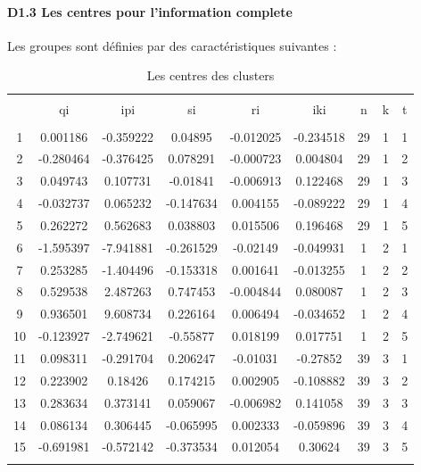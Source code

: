 \documentclass[11pt,]{article}
\let\oldparagraph\paragraph
\renewcommand{\paragraph}[1]{\oldparagraph{#1}\mbox{}}
\begin{document}
\FloatBarrier

\newpage

\hypertarget{d1.3-les-centres-pour-linformation-complete}{%
\paragraph{D1.3 Les centres pour l'information
complete}\label{d1.3-les-centres-pour-linformation-complete}}

Les groupes sont définies par des caractéristiques suivantes :

\FloatBarrier

\begin{table}[!htbp] \centering 
  \caption{Les centres des clusters} 
  \label{} 
\begin{tabular}{@{\extracolsep{5pt}} ccccccccc} 
\\[-1.8ex]\hline 
\hline \\[-1.8ex] 
 & qi & ipi & si & ri & iki & n & k & t \\ 
\hline \\[-1.8ex] 
1 & 0.001186 & -0.359222 & 0.04895 & -0.012025 & -0.234518 & 29 & 1 & 1 \\ 
2 & -0.280464 & -0.376425 & 0.078291 & -0.000723 & 0.004804 & 29 & 1 & 2 \\ 
3 & 0.049743 & 0.107731 & -0.01841 & -0.006913 & 0.122468 & 29 & 1 & 3 \\ 
4 & -0.032737 & 0.065232 & -0.147634 & 0.004155 & -0.089222 & 29 & 1 & 4 \\ 
5 & 0.262272 & 0.562683 & 0.038803 & 0.015506 & 0.196468 & 29 & 1 & 5 \\ 
6 & -1.595397 & -7.941881 & -0.261529 & -0.02149 & -0.049931 & 1 & 2 & 1 \\ 
7 & 0.253285 & -1.404496 & -0.153318 & 0.001641 & -0.013255 & 1 & 2 & 2 \\ 
8 & 0.529538 & 2.487263 & 0.747453 & -0.004844 & 0.080087 & 1 & 2 & 3 \\ 
9 & 0.936501 & 9.608734 & 0.226164 & 0.006494 & -0.034652 & 1 & 2 & 4 \\ 
10 & -0.123927 & -2.749621 & -0.55877 & 0.018199 & 0.017751 & 1 & 2 & 5 \\ 
11 & 0.098311 & -0.291704 & 0.206247 & -0.01031 & -0.27852 & 39 & 3 & 1 \\ 
12 & 0.223902 & 0.18426 & 0.174215 & 0.002905 & -0.108882 & 39 & 3 & 2 \\ 
13 & 0.283634 & 0.373141 & 0.059067 & -0.006982 & 0.141058 & 39 & 3 & 3 \\ 
14 & 0.086134 & 0.306445 & -0.065995 & 0.002333 & -0.059896 & 39 & 3 & 4 \\ 
15 & -0.691981 & -0.572142 & -0.373534 & 0.012054 & 0.30624 & 39 & 3 & 5 \\ 
\hline \\[-1.8ex] 
\end{tabular} 
\end{table}
\end{document}
